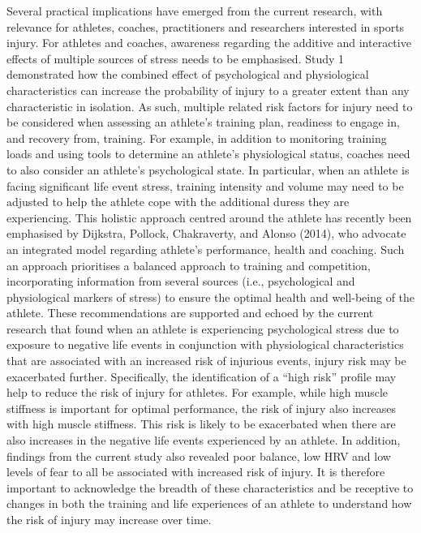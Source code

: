 \documentclass[man,floatsintext]{apa6}
\begin{document}
Several practical implications have emerged from the current research, with relevance for athletes, coaches, practitioners and researchers interested in sports injury.
For athletes and coaches, awareness regarding the additive and interactive effects of multiple sources of stress needs to be emphasised.
Study 1 demonstrated how the combined effect of psychological and physiological characteristics can increase the probability of injury to a greater extent than any characteristic in isolation.
As such, multiple related risk factors for injury need to be considered when assessing an athlete's training plan, readiness to engage in, and recovery from, training.
For example, in addition to monitoring training loads and using tools to determine an athlete's physiological status, coaches need to also consider an athlete's psychological state.
In particular, when an athlete is facing significant life event stress, training intensity and volume may need to be adjusted to help the athlete cope with the additional duress they are experiencing.
This holistic approach centred around the athlete has recently been emphasised by Dijkstra, Pollock, Chakraverty, and Alonso (2014), who advocate an integrated model regarding athlete's performance, health and coaching.
Such an approach prioritises a balanced approach to training and competition, incorporating information from several sources (i.e., psychological and physiological markers of stress) to ensure the optimal health and well-being of the athlete.
These recommendations are supported and echoed by the current research that found when an athlete is experiencing psychological stress due to exposure to negative life events in conjunction with physiological characteristics that are associated with an increased risk of injurious events, injury risk may be exacerbated further.
Specifically, the identification of a \enquote{high risk} profile may help to reduce the risk of injury for athletes.
For example, while high muscle stiffness is important for optimal performance, the risk of injury also increases with high muscle stiffness.
This risk is likely to be exacerbated when there are also increases in the negative life events experienced by an athlete.
In addition, findings from the current study also revealed poor balance, low HRV and low levels of fear to all be associated with increased risk of injury.
It is therefore important to acknowledge the breadth of these characteristics and be receptive to changes in both the training and life experiences of an athlete to understand how the risk of injury may increase over time.
\end{document}
